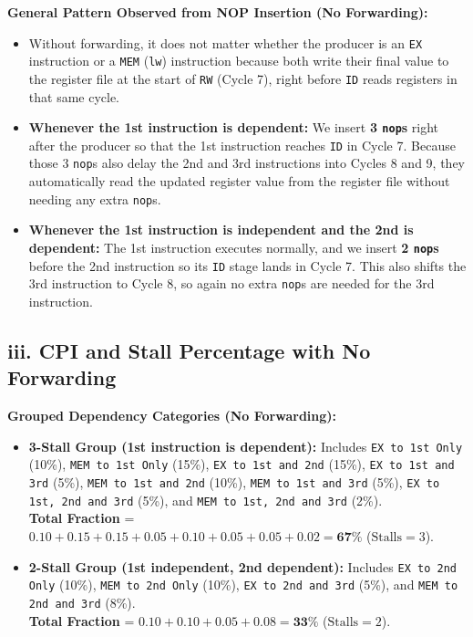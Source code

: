 \documentclass[11pt, a4paper]{article}
\begin{document}
\vspace{6pt}
\textbf{General Pattern Observed from NOP Insertion (No Forwarding):}
\begin{itemize}[noitemsep, topsep=2pt]
    \item Without forwarding, it does not matter whether the producer is an \texttt{EX} instruction or a \texttt{MEM} (\texttt{lw}) instruction because both write their final value to the register file at the start of \texttt{RW} (Cycle 7), right before \texttt{ID} reads registers in that same cycle.
    \item \textbf{Whenever the 1st instruction is dependent:} We insert \textbf{3 \texttt{nop}s} right after the producer so that the 1st instruction reaches \texttt{ID} in Cycle 7. Because those 3 \texttt{nop}s also delay the 2nd and 3rd instructions into Cycles 8 and 9, they automatically read the updated register value from the register file without needing any extra \texttt{nop}s.
    \item \textbf{Whenever the 1st instruction is independent and the 2nd is dependent:} The 1st instruction executes normally, and we insert \textbf{2 \texttt{nop}s} before the 2nd instruction so its \texttt{ID} stage lands in Cycle 7. This also shifts the 3rd instruction to Cycle 8, so again no extra \texttt{nop}s are needed for the 3rd instruction.
\end{itemize}

\subsection*{iii. CPI and Stall Percentage with No Forwarding}

\textbf{Grouped Dependency Categories (No Forwarding):}
\begin{itemize}[noitemsep, topsep=2pt]
    \item \textbf{3-Stall Group (1st instruction is dependent):} Includes \texttt{EX to 1st Only} (10\%), \texttt{MEM to 1st Only} (15\%), \texttt{EX to 1st and 2nd} (15\%), \texttt{EX to 1st and 3rd} (5\%), \texttt{MEM to 1st and 2nd} (10\%), \texttt{MEM to 1st and 3rd} (5\%), \texttt{EX to 1st, 2nd and 3rd} (5\%), and \texttt{MEM to 1st, 2nd and 3rd} (2\%). \\
    \textbf{Total Fraction} = $0.10 + 0.15 + 0.15 + 0.05 + 0.10 + 0.05 + 0.05 + 0.02 = \mathbf{67\%}$ ($\text{Stalls} = 3$).
    
    \item \textbf{2-Stall Group (1st independent, 2nd dependent):} Includes \texttt{EX to 2nd Only} (10\%), \texttt{MEM to 2nd Only} (10\%), \texttt{EX to 2nd and 3rd} (5\%), and \texttt{MEM to 2nd and 3rd} (8\%). \\
    \textbf{Total Fraction} = $0.10 + 0.10 + 0.05 + 0.08 = \mathbf{33\%}$ ($\text{Stalls} = 2$).
\end{itemize}
\end{document}

